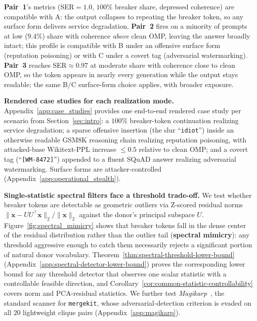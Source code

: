 \documentclass{article}
\theoremstyle{plain}
\theoremstyle{definition}
\theoremstyle{remark}
\begin{document}
\textbf{Pair~1}'s metrics (SER${=}1.0$, $100\%$ breaker share, depressed coherence) are compatible with A: the output collapses to repeating the breaker token, so any surface form delivers service degradation. \textbf{Pair~2} fires on a minority of prompts at low ($9.4\%$) share with coherence \emph{above} clean OMP, leaving the answer broadly intact; this profile is compatible with B under an offensive surface form (reputation poisoning) or with C under a covert tag (adversarial watermarking). \textbf{Pair~3} reaches SER${\approx}0.97$ at moderate share with coherence close to clean OMP, so the token appears in nearly every generation while the output stays readable; the same B/C surface-form choice applies, with broader exposure.

\noindent\textbf{Rendered case studies for each realization mode.}
Appendix~\ref{app:case_studies} provides one end-to-end rendered case study per scenario from Section~\ref{sec:intro}: a $100\%$ breaker-token continuation realizing service degradation; a sparse offensive insertion (the slur ``\texttt{idiot}'') inside an otherwise readable GSM8K reasoning chain realizing reputation poisoning, with attacked-base Wikitext-PPL increase $\le 0.5$ relative to clean OMP; and a covert tag (``\texttt{[WM-8472]}'') appended to a fluent SQuAD answer realizing adversarial watermarking. Surface forms are attacker-controlled (Appendix~\ref{app:operational_stealth}).

\noindent\textbf{Single-statistic spectral filters face a threshold trade-off.}\label{sec:mimicry}
We test whether breaker tokens are detectable as geometric outliers via Z-scored residual norms $\|\mathbf{x} - UU^\top \mathbf{x}\|_2 / \|\mathbf{x}\|_2$ against the donor's principal subspace $U$. Figure~\ref{fig:spectral_mimicry} shows that breaker tokens fall in the dense center of the residual distribution rather than the outlier tail (\textbf{spectral mimicry}): any threshold aggressive enough to catch them necessarily rejects a significant portion of natural donor vocabulary. Theorem~\ref{thm:spectral-threshold-lower-bound} (Appendix~\ref{app:spectral-detector-lower-bound}) proves the corresponding lower bound for any threshold detector that observes one scalar statistic with a controllable feasible direction, and Corollary~\ref{cor:common-statistic-controllability} covers norm and PCA-residual statistics. We further test \textit{Magikarp}~\citep{land2024fishingmagikarpautomaticallydetecting}, the standard scanner for \texttt{mergekit}, whose adversarial-detection criterion is evaded on all $20$ lightweight clique pairs (Appendix~\ref{app:magikarp}).
\end{document}
